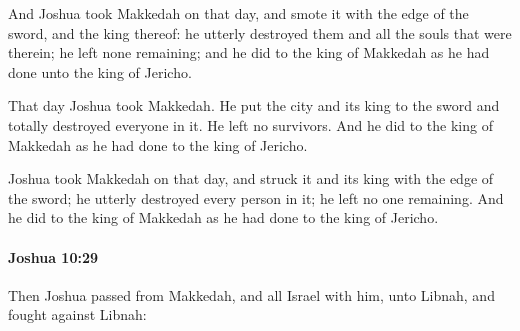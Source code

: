 			\begin{versebox}
					\item[BHS] 
					\item[ASV] And Joshua took Makkedah on that day, and smote it with the edge of the sword, and the king thereof: he utterly destroyed them and all the souls that were therein; he left none remaining; and he did to the king of Makkedah as he had done unto the king of Jericho.
					\item[NIV] That day Joshua took Makkedah. He put the city and its king to the sword and totally destroyed everyone in it. He left no survivors. And he did to the king of Makkedah as he had done to the king of Jericho.
					\item[NRSV] Joshua took Makkedah on that day, and struck it and its king with the edge of the sword; he utterly destroyed every person in it; he left no one remaining. And he did to the king of Makkedah as he had done to the king of Jericho.
			\end{versebox}

		\paragraph{Joshua 10:29} %
			\label{JOSHUA-10-29}

			Then Joshua passed from Makkedah, and all Israel with him, unto Libnah, and fought against Libnah:

